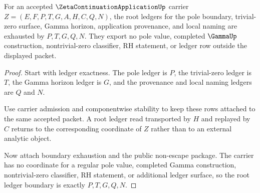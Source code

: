 \begin{theorem}
\label{thm:zeta-continuation-application-root-ledger-boundary}
For an accepted $\ZetaContinuationApplicationUp$ carrier $Z=(E,F,P,T,G,A,H,C,Q,N)$, the root ledgers for the pole boundary, trivial-zero surface, Gamma horizon, application provenance, and local naming are exhausted by $P,T,G,Q,N$. They export no pole value, completed $\GammaUp$ construction, nontrivial-zero classifier, RH statement, or ledger row outside the displayed packet.
\end{theorem}
\begin{proof}
Start with ledger exactness. The pole ledger is $P$, the trivial-zero ledger is $T$, the Gamma horizon ledger is $G$, and the provenance and local naming ledgers are $Q$ and $N$.

Use carrier admission and componentwise stability to keep these rows attached to the same accepted packet. A root ledger read transported by $H$ and replayed by $C$ returns to the corresponding coordinate of $Z$ rather than to an external analytic object.

Now attach boundary exhaustion and the public non-escape package. The carrier has no coordinate for a regular pole value, completed Gamma construction, nontrivial-zero classifier, RH statement, or additional ledger surface, so the root ledger boundary is exactly $P,T,G,Q,N$.
\end{proof}

